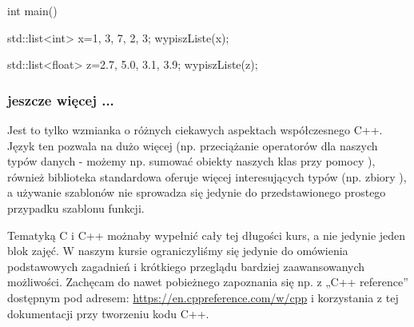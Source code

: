 \begin{CodeFrame*}[cpp]{}
int main() {
    std::list<int> x={1, 3, 7, 2, 3};
    wypiszListe(x);
    
    std::list<float> z={2.7, 5.0, 3.1, 3.9};
    wypiszListe(z);
}
\end{CodeFrame*}

\subsubsection{jeszcze więcej ... }

Jest to tylko wzmianka o różnych ciekawych aspektach współczesnego C++. Język ten pozwala na dużo więcej (np. przeciążanie operatorów dla naszych typów danych - możemy np. sumować obiekty naszych klas przy pomocy \cpp{+}), również biblioteka standardowa oferuje więcej interesujących typów (np. zbiory ), a używanie szablonów nie sprowadza się jedynie do przedstawionego prostego przypadku szablonu funkcji.

Tematyką C i C++ możnaby wypełnić cały tej długości kurs, a nie jedynie jeden blok zajęć. W naszym kursie ograniczyliśmy się jedynie do omówienia podstawowych zagadnień i krótkiego przeglądu bardziej zaawansowanych możliwości. Zachęcam do nawet pobieżnego zapoznania się np. z „C++ reference” dostępnym pod adresem: \url{https://en.cppreference.com/w/cpp} i korzystania z tej dokumentacji przy tworzeniu kodu C++.
